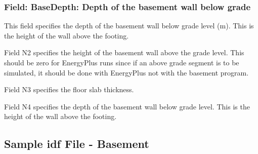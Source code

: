 \subsubsection{Field: BaseDepth: Depth of the basement wall below grade}\label{field-basedepth-depth-of-the-basement-wall-below-grade}

This field specifies the depth of the basement wall below grade level (m). This is the height of the wall above the footing.

Field N2 specifies the height of the basement wall above the grade level. This should be zero for EnergyPlus runs since if an above grade segment is to be simulated, it should be done with EnergyPlus not with the basement program.

Field N3 specifies the floor slab thickness.

Field N4 specifies the depth of the basement wall below grade level. This is the height of the wall above the footing.

\subsection{Sample idf File - Basement}\label{sample-idf-file---basement}


